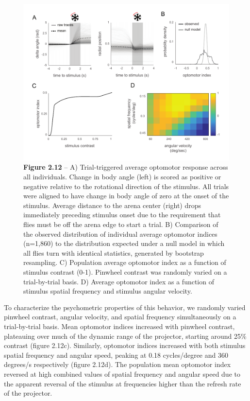 \documentclass[12pt,letterpaper]{article}
\begin{document}
\begin{figure}[t!]
 \includegraphics[width=\textwidth]{../figures/chapter_2/fig_2-12.pdf}
 \caption*{\textbf{Figure 2.12} --  A) Trial-triggered average optomotor response across all individuals. Change in body angle (left) is scored as positive or negative relative to the rotational direction of the stimulus. All trials were aligned to have change in body angle of zero at the onset of the stimulus. Average distance to the arena center (right) drops immediately preceding stimulus onset due to the requirement that flies must be off the arena edge to start a trial. B) Comparison of the observed distribution of individual average optomotor indices (n=1,860) to the distribution expected under a null model in which all flies turn with identical statistics, generated by bootstrap resampling. C) Population average optomotor index as a function of stimulus contrast (0-1). Pinwheel contrast was randomly varied on a trial-by-trial basis. D) Average optomotor index as a function of stimulus spatial frequency and stimulus angular velocity.}
\end{figure}

To characterize the psychometric properties of this behavior, we randomly varied pinwheel contrast, angular velocity, and spatial frequency simultaneously on a trial-by-trial basis. Mean optomotor indices increased with pinwheel contrast, plateauing over much of the dynamic range of the projector, starting around 25\% contrast (figure 2.12c). Similarly, optomotor indices increased with both stimulus spatial frequency and angular speed, peaking at 0.18 cycles/degree and 360 degrees/s respectively (figure 2.12d). The population mean optomotor index reversed at high combined values of spatial frequency and angular speed due to the apparent reversal of the stimulus at frequencies higher than the refresh rate of the projector.
\end{document}

